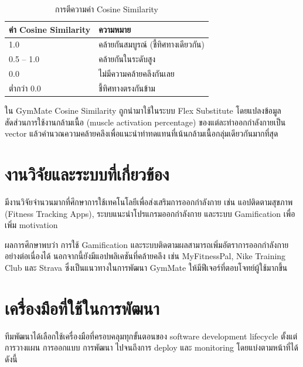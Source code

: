 \begin{table}[h]
\centering
\begin{tabular}{@{}ll@{}}
\toprule
\textbf{ค่า Cosine Similarity} & \textbf{ความหมาย} \\
\midrule
1.0                     & คล้ายกันสมบูรณ์ (ชี้ทิศทางเดียวกัน) \\
0.5 -- 1.0              & คล้ายกันในระดับสูง \\
0.0                     & ไม่มีความคล้ายคลึงกันเลย \\
ต่ำกว่า 0.0             & ชี้ทิศทางตรงกันข้าม \\
\bottomrule
\end{tabular}
\caption{การตีความค่า Cosine Similarity}
\label{tab:cosine}
\end{table}

ใน GymMate Cosine Similarity ถูกนำมาใช้ในระบบ Flex Substitute โดยแปลงข้อมูลสัดส่วนการใช้งานกล้ามเนื้อ (muscle activation percentage) ของแต่ละท่าออกกำลังกายเป็น vector แล้วคำนวณความคล้ายคลึงเพื่อแนะนำท่าทดแทนที่เน้นกล้ามเนื้อกลุ่มเดียวกันมากที่สุด

\section{งานวิจัยและระบบที่เกี่ยวข้อง}
\label{sec:related-work}

\noindent
มีงานวิจัยจำนวนมากที่ศึกษาการใช้เทคโนโลยีเพื่อส่งเสริมการออกกำลังกาย เช่น แอปติดตามสุขภาพ (Fitness Tracking Apps), ระบบแนะนำโปรแกรมออกกำลังกาย และระบบ Gamification เพื่อเพิ่ม motivation \cite{hhs2018}

ผลการศึกษาพบว่า การใช้ Gamification และระบบติดตามผลสามารถเพิ่มอัตราการออกกำลังกายอย่างต่อเนื่องได้ นอกจากนี้ยังมีแอปพลิเคชันที่คล้ายคลึง เช่น MyFitnessPal, Nike Training Club และ Strava ซึ่งเป็นแนวทางในการพัฒนา GymMate ให้มีฟีเจอร์ที่ตอบโจทย์ผู้ใช้มากขึ้น

\section{เครื่องมือที่ใช้ในการพัฒนา}
\label{sec:dev-tools}

\noindent
ทีมพัฒนาได้เลือกใช้เครื่องมือที่ครอบคลุมทุกขั้นตอนของ software development lifecycle ตั้งแต่การวางแผน การออกแบบ การพัฒนา ไปจนถึงการ deploy และ monitoring โดยแบ่งตามหน้าที่ได้ดังนี้

